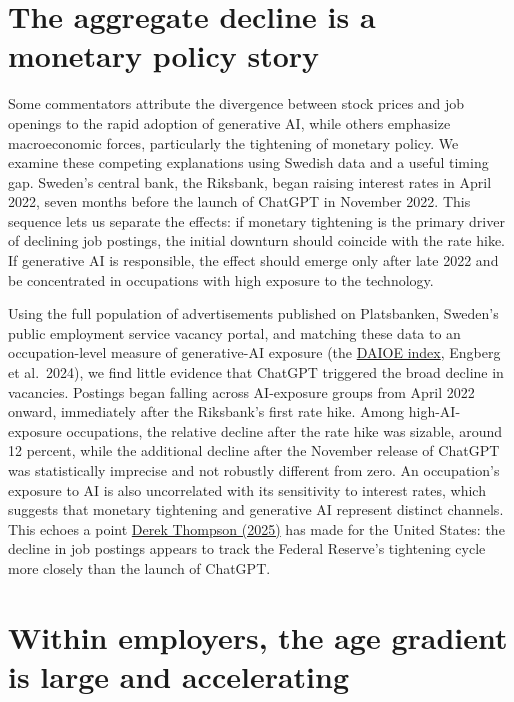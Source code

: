 \documentclass[12pt]{article}
\begin{document}
\section*{The aggregate decline is a monetary policy story}

Some commentators attribute the divergence between stock prices and job openings to the rapid
adoption of generative AI, while others emphasize macroeconomic forces, particularly the tightening
of monetary policy. We examine these competing explanations using Swedish data and a useful timing
gap. Sweden's central bank, the Riksbank, began raising interest rates in April 2022, seven months
before the launch of ChatGPT in November 2022. This sequence lets us separate the effects: if
monetary tightening is the primary driver of declining job postings, the initial downturn should
coincide with the rate hike. If generative AI is responsible, the effect should emerge only after
late 2022 and be concentrated in occupations with high exposure to the technology.

Using the full population of advertisements published on Platsbanken, Sweden's public employment
service vacancy portal, and matching these data to an occupation-level measure of generative-AI
exposure (the \href{https://docs.iza.org/dp16717.pdf}{DAIOE index}, Engberg et al.\ 2024), we find
little evidence that ChatGPT triggered the broad decline in vacancies. Postings began falling across
AI-exposure groups from April 2022 onward, immediately after the Riksbank's first rate hike. Among
high-AI-exposure occupations, the relative decline after the rate hike was sizable, around 12
percent, while the additional decline after the November release of ChatGPT was statistically
imprecise and not robustly different from zero. An occupation's exposure to AI is also uncorrelated
with its sensitivity to interest rates, which suggests that monetary tightening and generative AI
represent distinct channels. This echoes a point
\href{https://www.derekthompson.org/p/is-this-the-new-scariest-chart-in}{Derek Thompson (2025)} has
made for the United States: the decline in job postings appears to track the Federal Reserve's
tightening cycle more closely than the launch of ChatGPT.

\section*{Within employers, the age gradient is large and accelerating}
\end{document}
